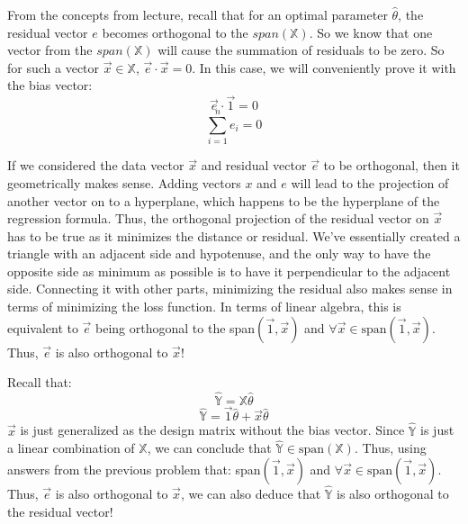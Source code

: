 \documentclass[11pt]{article}
\begin{document}
\newpage


\begin{Parts}
	\item
	\begin{Answer}
		From the concepts from lecture, recall that for an optimal parameter $\hat{\theta}$, the residual vector $e$ becomes orthogonal to the $span(\mathbb{X})$. So we know that one vector from the $span(\mathbb{X})$ will cause the summation of residuals to be zero. So for such a vector $\vec{x}  \in \mathbb{X}$, $\vec{e}\cdot\vec{x} = 0$. In this case, we will conveniently prove it with the bias vector:
		$$\vec{e}\cdot\vec{1} = 0$$
		$$\sum_{i = 1}^ne_i = 0$$
	\end{Answer}
	\item
	\begin{Answer}
		If we considered the data vector $\vec{x}$ and residual vector $\vec{e}$ to be orthogonal, then it geometrically makes sense. Adding vectors $x$ and $e$ will lead to the projection of another vector on to a hyperplane, which happens to be the hyperplane of the regression formula. Thus, the orthogonal projection of the residual vector on $\vec{x}$ has to be true as it minimizes the distance or residual. We've essentially created a triangle with an adjacent side and hypotenuse, and the only way to have the opposite side as minimum as possible is to have it perpendicular to the adjacent side. Connecting it with other parts, minimizing the residual also makes sense in terms of minimizing the loss function. In terms of linear algebra, this is equivalent to $\vec{e}$ being orthogonal to the span$(\vec{1}, \vec{x})$ and $\forall \vec{x} \in \text{span}(\vec{1}, \vec{x})$. Thus, $\vec{e}$ is also orthogonal to $\vec{x}$!
	\end{Answer}
	\item 
	\begin{Answer}
		Recall that:
		$$\mathbb{\hat{Y}} = \mathbb{X}\hat{\theta}$$
		$$\mathbb{\hat{Y}} = \vec{1}\hat{\theta} + \vec{x}\hat{\theta}$$
		$\vec{x}$ is just generalized as the design matrix without the bias vector. Since $\mathbb{\hat{Y}}$ is just a linear combination of $\mathbb{X}$, we can conclude that $\mathbb{\hat{Y}} \in \text{span}(\mathbb{X})$. Thus, using answers from the previous problem that: span$(\vec{1}, \vec{x})$ and $\forall \vec{x} \in \text{span}(\vec{1}, \vec{x})$. Thus, $\vec{e}$ is also orthogonal to $\vec{x}$, we can also deduce that $\mathbb{\hat{Y}}$ is also orthogonal to the residual vector!
	\end{Answer}
\end{Parts}
\newpage
\end{document}
